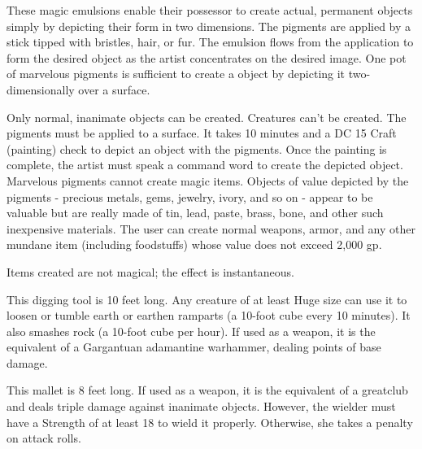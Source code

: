{

 These magic emulsions enable their possessor to create actual, permanent objects simply by depicting their form in two dimensions. The pigments are applied by a stick tipped with bristles, hair, or fur. The emulsion flows from the application to form the desired object as the artist concentrates on the desired image. One pot of marvelous pigments is sufficient to create a  object by depicting it two-dimensionally over a  surface.

Only normal, inanimate objects can be created. Creatures can't be created. The pigments must be applied to a surface. It takes 10 minutes and a DC 15 Craft (painting) check to depict an object with the pigments. Once the painting is complete, the artist must speak a command word to create the depicted object. Marvelous pigments cannot create magic items. Objects of value depicted by the pigments  - precious metals, gems, jewelry, ivory, and so on -  appear to be valuable but are really made of tin, lead, paste, brass, bone, and other such inexpensive materials. The user can create normal weapons, armor, and any other mundane item (including foodstuffs) whose value does not exceed 2,000 gp.

Items created are not magical; the effect is instantaneous.


 This digging tool is 10 feet long. Any creature of at least Huge size can use it to loosen or tumble earth or earthen ramparts (a 10-foot cube every 10 minutes). It also smashes rock (a 10-foot cube per hour). If used as a weapon, it is the equivalent of a Gargantuan  adamantine warhammer, dealing  points of base damage.


 This mallet is 8 feet long. If used as a weapon, it is the equivalent of a  greatclub and deals triple damage against inanimate objects. However, the wielder must have a Strength of at least 18 to wield it properly. Otherwise, she takes a  penalty on attack rolls.

}
